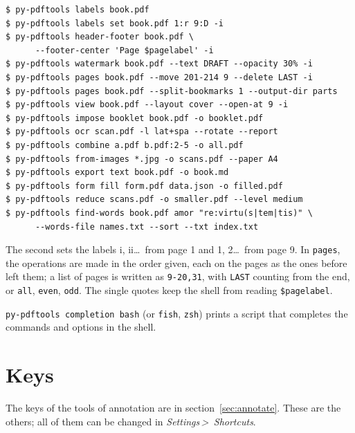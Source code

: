 \documentclass[12pt,
              article,
              oneside
              ]{memoir}
\newcommand*{\menu}[1]{\textit{#1}}
\newcommand*{\then}{\,>\,}
\begin{document}
\begin{verbatim}
$ py-pdftools labels book.pdf
$ py-pdftools labels set book.pdf 1:r 9:D -i
$ py-pdftools header-footer book.pdf \
      --footer-center 'Page $pagelabel' -i
$ py-pdftools watermark book.pdf --text DRAFT --opacity 30% -i
$ py-pdftools pages book.pdf --move 201-214 9 --delete LAST -i
$ py-pdftools pages book.pdf --split-bookmarks 1 --output-dir parts
$ py-pdftools view book.pdf --layout cover --open-at 9 -i
$ py-pdftools impose booklet book.pdf -o booklet.pdf
$ py-pdftools ocr scan.pdf -l lat+spa --rotate --report
$ py-pdftools combine a.pdf b.pdf:2-5 -o all.pdf
$ py-pdftools from-images *.jpg -o scans.pdf --paper A4
$ py-pdftools export text book.pdf -o book.md
$ py-pdftools form fill form.pdf data.json -o filled.pdf
$ py-pdftools reduce scans.pdf -o smaller.pdf --level medium
$ py-pdftools find-words book.pdf amor "re:virtu(s|tem|tis)" \
      --words-file names.txt --sort --txt index.txt
\end{verbatim}

\noindent{}%
The second sets the labels i, ii\ldots\ from page 1 and 1,
2\ldots\ from page 9. In \texttt{pages}, the operations are made in the
order given, each on the pages as the ones before left them; a list of
pages is written as \texttt{9-20,31}, with \texttt{LAST} counting from the
end, or \texttt{all}, \texttt{even}, \texttt{odd}. The single quotes keep
the shell from reading \texttt{\$pagelabel}.

%
\texttt{py-pdftools completion bash} (or \texttt{fish}, \texttt{zsh})
prints a script that completes the commands and options in the shell.

\section{Keys}
\label{sec:keys}

%
The keys of the tools of annotation are in section~\ref{sec:annotate}.
These are the others; all of them can be changed in \menu{Settings\then
Shortcuts}.
\end{document}
